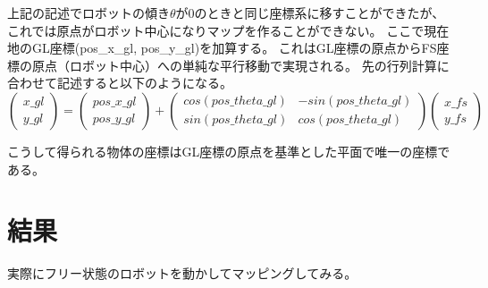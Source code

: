 \documentclass[main]{subfiles}
\begin{document}
上記の記述でロボットの傾き$\theta $が0のときと同じ座標系に移すことができたが、
これでは原点がロボット中心になりマップを作ることができない。
ここで現在地のGL座標(pos\_x\_gl, pos\_y\_gl)を加算する。
これはGL座標の原点からFS座標の原点（ロボット中心）への単純な平行移動で実現される。
先の行列計算に合わせて記述すると以下のようになる。
\[
	\left(
	\begin{array}{cc}
		x\_gl \\
		y\_gl
	\end{array}
	\right)
	=
	\left(
	\begin{array}{c}
		pos\_x\_gl \\
		pos\_y\_gl
	\end{array}
	\right)
	+
	\left(
	\begin{array}{cc}
		cos(pos\_theta\_gl) & -sin(pos\_theta\_gl) \\
		sin(pos\_theta\_gl) & cos(pos\_theta\_gl)
	\end{array}
	\right)
	\left(
	\begin{array}{c}
		x\_fs \\
		y\_fs
	\end{array}
	\right)
\]

こうして得られる物体の座標はGL座標の原点を基準とした平面で唯一の座標である。

\section{結果}
実際にフリー状態のロボットを動かしてマッピングしてみる。
\end{document}

